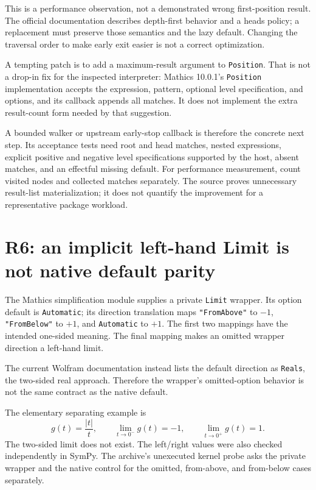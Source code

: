 \documentclass[11pt,a4paper]{article}
\newcommand{\code}[1]{\texttt{#1}}
\begin{document}
This is a performance observation, not a demonstrated wrong first-position result. The official documentation describes depth-first behavior and a heads policy; a replacement must preserve those semantics and the lazy default. Changing the traversal order to make early exit easier is not a correct optimization.\cite{wlfirstposition}

A tempting patch is to add a maximum-result argument to \code{Position}. That is not a drop-in fix for the inspected interpreter: Mathics 10.0.1's \code{Position} implementation accepts the expression, pattern, optional level specification, and options, and its callback appends all matches. It does not implement the extra result-count form needed by that suggestion.\cite{up-position}

A bounded walker or upstream early-stop callback is therefore the concrete next step. Its acceptance tests need root and head matches, nested expressions, explicit positive and negative level specifications supported by the host, absent matches, and an effectful missing default. For performance measurement, count visited nodes and collected matches separately. The source proves unnecessary result-list materialization; it does not quantify the improvement for a representative package workload.

\section{R6: an implicit left-hand Limit is not native default parity}
The Mathics simplification module supplies a private \code{Limit} wrapper. Its option default is \code{Automatic}; its direction translation maps \code{"FromAbove"} to $-1$, \code{"FromBelow"} to $+1$, and \code{Automatic} to $+1$. The first two mappings have the intended one-sided meaning. The final mapping makes an omitted wrapper direction a left-hand limit.\cite{simplification}

The current Wolfram documentation instead lists the default direction as \code{Reals}, the two-sided real approach. Therefore the wrapper's omitted-option behavior is not the same contract as the native default.\cite{wllimit}

The elementary separating example is
\begin{equation}
 g(t)=\frac{|t|}{t},\qquad
 \lim_{t\to0^-}g(t)=-1,\qquad
 \lim_{t\to0^+}g(t)=1.
\end{equation}
The two-sided limit does not exist. The left/right values were also checked independently in SymPy. The archive's unexecuted kernel probe asks the private wrapper and the native control for the omitted, from-above, and from-below cases separately.
\end{document}
